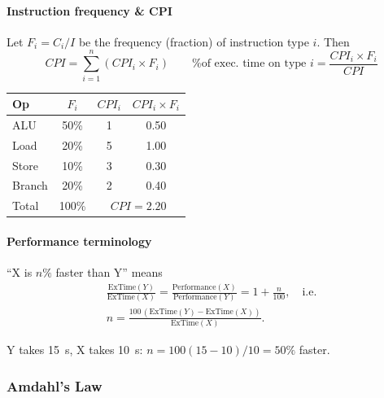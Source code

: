 \paragraph{Instruction frequency \& CPI}
\begin{prop}
Let $F_i = C_i / I$ be the frequency (fraction) of instruction type $i$.
Then
\[
  CPI = \sum_{i=1}^n \left(CPI_i \times F_i\right)
  \qquad \text{\% of exec.\ time on type } i = \frac{CPI_i \times F_i}{CPI}
\]
\end{prop}

\begin{eg}
\leavevmode
\begin{center}
\begin{tabular}{@{}lccc@{}}
\toprule
Op & $F_i$ & $CPI_i$ & $CPI_i \times F_i$ \\
\midrule
ALU    & 50\% & 1 & 0.50 \\
Load   & 20\% & 5 & 1.00 \\
Store  & 10\% & 3 & 0.30 \\
Branch & 20\% & 2 & 0.40 \\
\midrule
Total  & 100\% & \multicolumn{2}{c}{$CPI = 2.20$} \\
\bottomrule
\end{tabular}
\end{center}
\end{eg}

\paragraph{Performance terminology}
\begin{definition}[``$n\%$ faster'']
``X is $n\%$ faster than Y'' means
\begin{gather*}
  \frac{\text{ExTime}(Y)}{\text{ExTime}(X)} = \frac{\text{Performance}(X)}
  {\text{Performance}(Y)} = 1 + \frac{n}{100},
  \quad\text{i.e.}\\
  n = \frac{100\,(\text{ExTime}(Y) - \text{ExTime}(X))}{\text{ExTime}(X)}.
\end{gather*}
\end{definition}
\begin{eg}
Y takes 15~s, X takes 10~s: $n = 100(15-10)/10 = 50\%$ faster.
\end{eg}

\subsubsection{Amdahl's Law}
\label{sec:amdahl}

